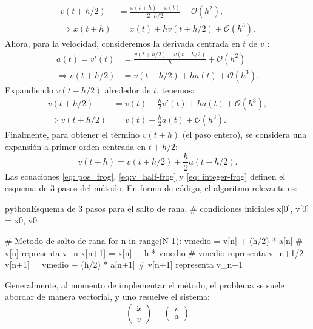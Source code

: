     \begin{align}
      v(t+h/2) &= \frac{x(t+h) - x(t)}{2\cdot h/2} + \mathcal{O}(h^2), \\
      \Rightarrow x(t+h) &= x(t) + hv(t+h/2) + \mathcal{O}(h^3). \label{eq: pos_frog}
    \end{align}
    Ahora, para la velocidad, consideremos la derivada centrada en $t$ de $v$ :
    \begin{align}
      a(t) = v'(t) &= \frac{v(t+h/2) - v(t-h/2)}{h} + \mathcal{O}(h^2) \\
      \Rightarrow v(t+h/2) &= v(t-h/2) + ha(t) + \mathcal{O}(h^3).
    \end{align}
    Expandiendo $v(t-h/2)$ alrededor de $t$, tenemos:
    \begin{align}
      v(t+h/2) &= v(t) -\frac{h}{2}v'(t) + ha(t) + \mathcal{O}(h^3), \\
      \Rightarrow v(t+h/2) &= v(t) + \frac{h}{2}a(t) + \mathcal{O}(h^3). \label{eq:v_half-frog}
    \end{align}
    Finalmente, para obtener el término $v(t+h)$ (el paso entero), se considera una expansión a primer orden centrada en $t +h/2$:
    \begin{equation}
      v(t+h) = v(t+h/2) + \frac{h}{2}a(t+h/2). \label{eq: integer-frog}
    \end{equation}
    Las ecuaciones \eqref{eq: pos_frog}, \eqref{eq:v_half-frog} y \eqref{eq: integer-frog} definen el esquema de 3 pasos del método. En forma de código, el algoritmo relevante es:

    \begin{sourcecode}{python}{Esquema de 3 pasos para el salto de rana.}
      # condiciones iniciales
      x[0], v[0] = x0, v0

      # Metodo de salto de rana
      for n in range(N-1):
          vmedio = v[n] + (h/2) * a[n] # v[n] representa v_n
          x[n+1] = x[n] + h * vmedio  # vmedio representa v_n+1/2
          v[n+1] = vmedio + (h/2) * a[n+1] # v[n+1] representa v_n+1
    \end{sourcecode}
    Generalmente, al momento de implementar el método, el problema se suele abordar de manera vectorial, y uno resuelve el sistema:
    \begin{equation}
     \begin{pmatrix}
       \dot{x} \\
       \dot{v}
     \end{pmatrix} = 
      \begin{pmatrix}
        v \\
        a
      \end{pmatrix}
    \end{equation}

